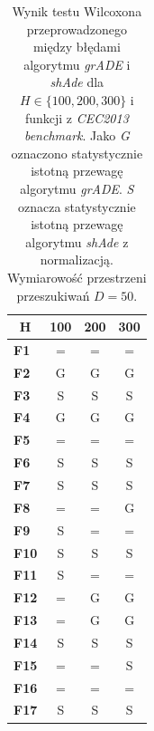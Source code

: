 \documentclass[12pt,a4paper]{report}
\begin{document}
{{{{{{{\begin{table}[]
\centering
\caption{Wynik testu Wilcoxona przeprowadzonego między błędami algorytmu \emph{grADE} i \emph{shAde} dla $H \in \{100, 200, 300\}$ i funkcji z \emph{CEC2013 benchmark}. Jako \emph{G} oznaczono statystycznie istotną przewagę algorytmu \emph{grADE}. \emph{S} oznacza statystycznie istotną przewagę algorytmu \emph{shAde} z normalizacją. Wymiarowość przestrzeni przeszukiwań $D = 50$.}
\label{Anal23}
\begin{tabular}{|l|c|c|c|}
\hline
\multicolumn{1}{|c|}{{\bf H}} & {\bf 100} & {\bf 200} & {\bf 300} \\ \hline
{\bf F1}                      & =        & =         & =         \\ \hline
{\bf F2}                      & G        & G         & G         \\ \hline
{\bf F3}                      & S        & S         & S         \\ \hline
{\bf F4}                      & G        & G         & G         \\ \hline
{\bf F5}                      & =        & =         & =         \\ \hline
{\bf F6}                      & S        & S         & S         \\ \hline
{\bf F7}                      & S        & S         & S         \\ \hline
{\bf F8}                      & =        & =         & G         \\ \hline
{\bf F9}                      & S        & =         & =         \\ \hline
{\bf F10}                     & S        & S         & S         \\ \hline
{\bf F11}                     & S        & =         & =         \\ \hline
{\bf F12}                     & =        & G         & G         \\ \hline
{\bf F13}                     & =        & G         & G         \\ \hline
{\bf F14}                     & S        & S         & S         \\ \hline
{\bf F15}                     & =        & =         & S         \\ \hline
{\bf F16}                     & =        & =         & =         \\ \hline
{\bf F17}                     & S        & S         & S         \\ \hline

\end{tabular}
\end{table}}}}}}}}
\end{document}
